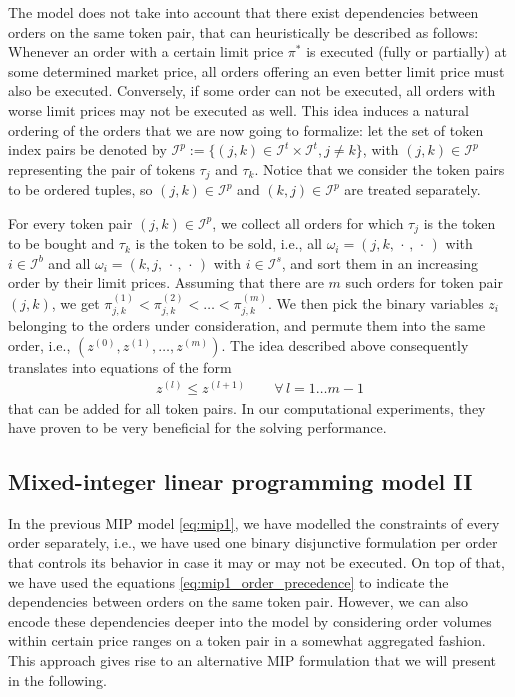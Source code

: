 \documentclass[11pt,parskip=full]{scrartcl}%
\newcommand*{\ie}{i.e., }
\newcommand*{\itokens}{\mathcal{I}^t}       %
\newcommand*{\itokenpairs}{\mathcal{I}^p}   %
\newcommand*{\ibuyorders}{\mathcal{I}^b}    %
\newcommand*{\isellorders}{\mathcal{I}^s}   %
\begin{document}
The model does not take into account that there exist dependencies between orders on the same token
pair, that can heuristically be described as follows:
Whenever an order with a certain limit price $ \pi^* $ is executed (fully or partially) at some
determined market price, all orders offering an even better limit price must also be executed.
Conversely, if some order can not be executed, all orders with worse limit prices may not be
executed as well.
This idea induces a natural ordering of the orders that we are now going to formalize:
let the set of token index pairs be denoted by $ \itokenpairs := \{(j,k) \in \itokens \times
\itokens, j \neq k\} $, with $ (j,k) \in \itokenpairs $ representing the pair of tokens $ \tau_j $
and $ \tau_k $.
Notice that we consider the token pairs to be ordered tuples, so $ (j,k) \in \itokenpairs $ and
$ (k,j) \in \itokenpairs $ are treated separately.

For every token pair $ (j,k) \in \itokenpairs $, we collect all orders for which $ \tau_j $ is the
token to be bought and $ \tau_k $ is the token to be sold, \ie all
$ \omega_i = (j, k,\, \cdot \,,\, \cdot \,) $ with $ i \in \ibuyorders $ and all
$ \omega_i = (k, j,\, \cdot \,,\, \cdot \,) $ with $ i \in \isellorders $,
and sort them in an increasing order by their limit prices.
Assuming that there are $ m $ such orders for token pair $ (j,k) $, we get
$ \pi^{(1)}_{j,k} < \pi^{(2)}_{j,k} < \ldots < \pi^{(m)}_{j,k} $.
We then pick the binary variables $ z_i $ belonging to the orders under consideration, and permute
them into the same order, \ie $ (z^{(0)}, z^{(1)}, \ldots, z^{(m)}) $.
The idea described above consequently translates into equations of the form
\begin{align}
  z^{(l)} \le z^{(l+1)} \qquad \forall \, l = 1 \ldots m\!-\!1
  \label{eq:mip1_order_precedence}
\end{align}
that can be added for all token pairs.
In our computational experiments, they have proven to be very beneficial for the solving
performance.


\subsection{Mixed-integer linear programming model II}
\label{subsec:MIPmodel_2}

In the previous MIP model \eqref{eq:mip1}, we have modelled the constraints of every order
separately, \ie we have used one binary disjunctive formulation per order that controls its
behavior in case it may or may not be executed.
On top of that, we have used the equations \eqref{eq:mip1_order_precedence} to indicate the
dependencies between orders on the same token pair.
However, we can also encode these dependencies deeper into the model by considering order volumes
within certain price ranges on a token pair in a somewhat aggregated fashion.
This approach gives rise to an alternative MIP formulation that we will present in the following.
\end{document}
